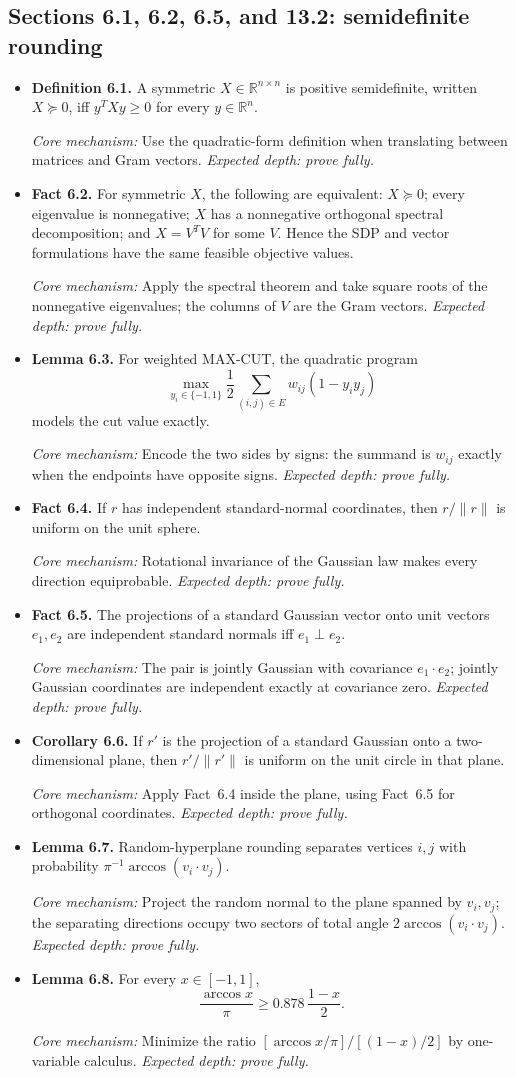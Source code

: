 \documentclass[11pt,a4paper]{article}
\newcommand{\R}{\mathbb R}
\newcommand{\1}{\mathbf 1}
\newcommand{\catalogue}[4]{%
  \item \textbf{#1.} #2\par
  {\footnotesize\emph{Core mechanism:} #3
  \emph{Expected depth: #4.}}}
\begin{document}
\subsection*{Sections 6.1, 6.2, 6.5, and 13.2: semidefinite rounding}
\begin{itemize}
\catalogue{Definition 6.1}{A symmetric $X\in\R^{n\times n}$ is positive
semidefinite, written $X\succeq0$, iff $y^TXy\geq0$ for every $y\in\R^n$.}
{Use the quadratic-form definition when translating between matrices and Gram
vectors.}{prove fully}

\catalogue{Fact 6.2}{For symmetric $X$, the following are equivalent:
$X\succeq0$; every eigenvalue is nonnegative; $X$ has a nonnegative orthogonal
spectral decomposition; and $X=V^TV$ for some $V$. Hence the SDP and vector
formulations have the same feasible objective values.}{Apply the spectral
theorem and take square roots of the nonnegative eigenvalues; the columns of
$V$ are the Gram vectors.}{prove fully}

\catalogue{Lemma 6.3}{For weighted MAX-CUT, the quadratic program
\[
\max_{y_i\in\{-1,1\}}\frac12\sum_{(i,j)\in E}w_{ij}(1-y_iy_j)
\]
models the cut value exactly.}{Encode the two sides by signs: the summand is
$w_{ij}$ exactly when the endpoints have opposite signs.}{prove fully}

\catalogue{Fact 6.4}{If $r$ has independent standard-normal coordinates, then
$r/\|r\|$ is uniform on the unit sphere.}{Rotational invariance of the Gaussian
law makes every direction equiprobable.}{prove fully}

\catalogue{Fact 6.5}{The projections of a standard Gaussian vector onto unit
vectors $e_1,e_2$ are independent standard normals iff $e_1\perp e_2$.}
{The pair is jointly Gaussian with covariance $e_1\cdot e_2$; jointly Gaussian
coordinates are independent exactly at covariance zero.}{prove fully}

\catalogue{Corollary 6.6}{If $r'$ is the projection of a standard Gaussian
onto a two-dimensional plane, then $r'/\|r'\|$ is uniform on the unit circle
in that plane.}{Apply Fact~6.4 inside the plane, using Fact~6.5 for orthogonal
coordinates.}{prove fully}

\catalogue{Lemma 6.7}{Random-hyperplane rounding separates vertices $i,j$ with
probability $\pi^{-1}\arccos(v_i\cdot v_j)$.}{Project the random normal to the
plane spanned by $v_i,v_j$; the separating directions occupy two sectors of
total angle $2\arccos(v_i\cdot v_j)$.}{prove fully}

\catalogue{Lemma 6.8}{For every $x\in[-1,1]$,
\[
\frac{\arccos x}{\pi}\geq0.878\,\frac{1-x}{2}.
\]}
{Minimize the ratio
$[\arccos x/\pi]/[(1-x)/2]$ by one-variable calculus.}{prove fully}


\end{itemize}
\end{document}
